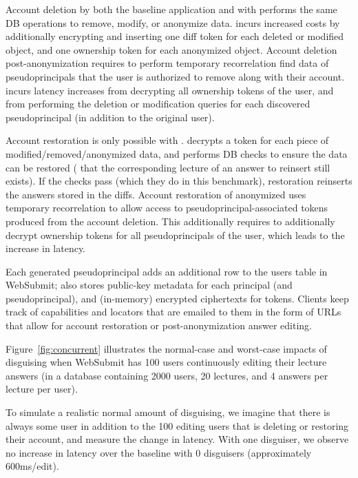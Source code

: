 Account deletion by both the baseline application and with \sys performs the same DB operations to remove, modify, or
anonymize data.  \sys incurs increased costs by additionally encrypting and inserting one diff token
for each deleted or modified object, and one ownership token for each anonymized object.  Account
deletion post-anonymization requires \sys to perform temporary recorrelation find data of
pseudoprincipals that the user is authorized to remove along with their account.  \sys incurs
latency increases from decrypting all ownership tokens of the user, and from performing the deletion
or modification queries for each discovered pseudoprincipal (in addition to the original user).

Account restoration is only possible with \sys. \sys decrypts a token for each piece of
modified/removed/anonymized data, and performs DB checks to ensure the data can be restored (\eg
that the corresponding lecture of an answer to reinsert still exists). If the checks pass (which
they do in this benchmark), restoration reinserts the answers stored in the diffs.
Account restoration of anonymized uses temporary recorrelation to allow \sys access to 
pseudoprincipal-associated tokens produced from the account deletion.
This additionally requires \sys to additionally decrypt ownership tokens for all
pseudoprincipals of the user, which leads to the increase in latency.

Each generated pseudoprincipal adds an additional row to the users table in WebSubmit; \sys also
stores public-key metadata for each principal (and pseudoprincipal), and (in-memory) encrypted
ciphertexts for tokens.  Clients keep track of capabilities and locators that are emailed to them in
the form of URLs that allow for account restoration or post-anonymization answer editing.

 Figure~\ref{fig:concurrent} illustrates the
normal-case and worst-case impacts of disguising when WebSubmit has 100 users continuously editing
their lecture answers (in a database containing 2000 users, 20 lectures, and 4 answers per lecture
per user).

To simulate a realistic normal amount of disguising, we imagine that there is always some user in
addition to the 100 editing users that is deleting or restoring their account, and measure the
change in latency. With one disguiser, we observe no increase in latency over the baseline with 0
disguisers (approximately 600ms/edit). 

